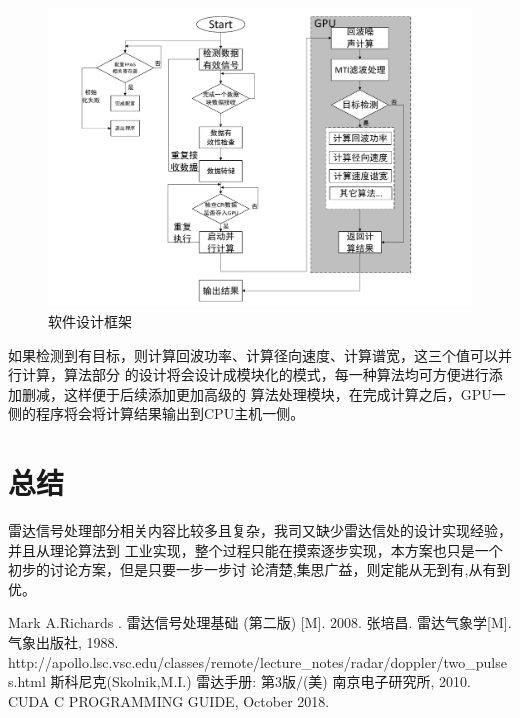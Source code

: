 \documentclass[a4paper,12pt]{report}
\begin{document}
\begin{spacing}{1.5}
\begin{figure}[hbtp]
    \centering
    \includegraphics [width=1.0\textwidth]{figure//softflow.pdf}
    \caption{软件设计框架}\label{softflowpdf}
\end{figure}

如果检测到有目标，则计算回波功率、计算径向速度、计算谱宽，这三个值可以并行计算，算法部分
的设计将会设计成模块化的模式，每一种算法均可方便进行添加删减，这样便于后续添加更加高级的
算法处理模块，在完成计算之后，GPU一侧的程序将会将计算结果输出到CPU主机一侧。

\end{spacing}
\chapter{总结}
\begin{spacing}{1.5}       
雷达信号处理部分相关内容比较多且复杂，我司又缺少雷达信处的设计实现经验，并且从理论算法到
工业实现，整个过程只能在摸索逐步实现，本方案也只是一个初步的讨论方案，但是只要一步一步讨
论清楚,集思广益，则定能从无到有,从有到优。
\end{spacing}


\begin{thebibliography}{99}
\songti {} 	
    Mark A.Richards . 雷达信号处理基础 (第二版) [M]. 2008.
    张培昌. 雷达气象学[M]. 气象出版社, 1988.
    http://apollo.lsc.vsc.edu/classes/remote/lecture\_notes/radar/doppler/two\_pulses.html
    斯科尼克(Skolnik,M.I.) 雷达手册: 第3版/(美) 南京电子研究所, 2010.
    CUDA C PROGRAMMING GUIDE, October 2018.

\end{thebibliography}
\end{document}
